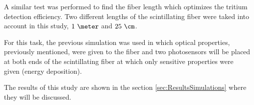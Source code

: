 A similar test was performed to find the fiber length which optimizes the tritium detection efficiency. Two different lengths of the scintillating fiber were taked into account in this study, $1~\meter$ and $25~\cm$. 

For this task, the previous simulation was used in which optical properties, previously mentioned, were given to the fiber and two photosensors will be placed at both ends of the scintillating fiber at which only sensitive properties were given (energy deposition).  

The results of this study are shown in the section \ref{sec:ResultsSimulations} where they will be discussed.